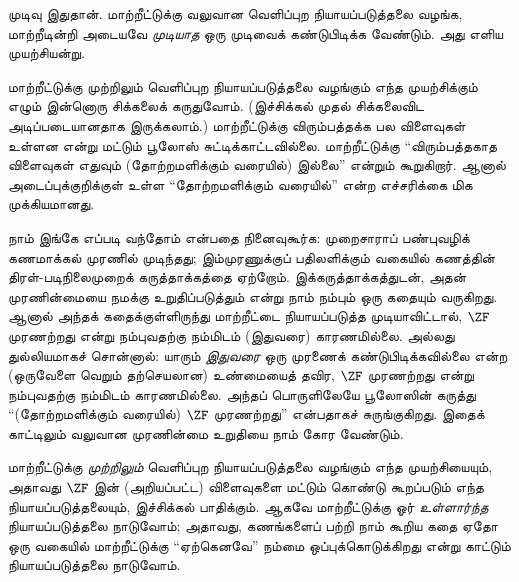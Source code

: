 \documentclass[../../../include/open-logic-section]{subfiles}
\begin{document}
முடிவு இதுதான். மாற்றீட்டுக்கு வலுவான வெளிப்புற நியாயப்படுத்தலை வழங்க,
மாற்றீடின்றி அடையவே \emph{முடியாத} ஒரு முடிவைக் கண்டுபிடிக்க வேண்டும்.
அது எளிய முயற்சியன்று.

மாற்றீட்டுக்கு முற்றிலும் வெளிப்புற நியாயப்படுத்தலை வழங்கும் எந்த
முயற்சிக்கும் எழும் இன்னொரு சிக்கலைக் கருதுவோம். (இச்சிக்கல் முதல்
சிக்கலைவிட அடிப்படையானதாக இருக்கலாம்.) மாற்றீட்டுக்கு விரும்பத்தக்க பல
விளைவுகள் உள்ளன என்று மட்டும் பூலோஸ் சுட்டிக்காட்டவில்லை. மாற்றீட்டுக்கு
``விரும்பத்தகாத விளைவுகள் எதுவும் (தோற்றமளிக்கும் வரையில்) இல்லை'' என்றும்
கூறுகிறார். ஆனால் அடைப்புக்குறிக்குள் உள்ள ``தோற்றமளிக்கும் வரையில்'' என்ற
எச்சரிக்கை மிக முக்கியமானது.

நாம் இங்கே எப்படி வந்தோம் என்பதை நினைவுகூர்க: முறைசாராப் பண்புவழிக்
கணமாக்கல் முரணில் முடிந்தது; இம்முரணுக்குப் பதிலளிக்கும் வகையில் கணத்தின்
திரள்-படிநிலைமுறைக் கருத்தாக்கத்தை ஏற்றோம். இக்கருத்தாக்கத்துடன், அதன்
முரணின்மையை நமக்கு உறுதிப்படுத்தும் என்று நாம் நம்பும் ஒரு கதையும் வருகிறது.
ஆனால் அந்தக் கதைக்குள்ளிருந்து மாற்றீட்டை நியாயப்படுத்த முடியாவிட்டால்,
$\ZF$ முரணற்றது என்று நம்புவதற்கு நம்மிடம் (இதுவரை) காரணமில்லை. அல்லது
துல்லியமாகச் சொன்னால்: யாரும் \emph{இதுவரை} ஒரு முரணைக் கண்டுபிடிக்கவில்லை
என்ற (ஒருவேளை வெறும் தற்செயலான) உண்மையைத் தவிர, $\ZF$ முரணற்றது என்று
நம்புவதற்கு நம்மிடம் காரணமில்லை. அந்தப் பொருளிலேயே பூலோஸின் கருத்து
``(தோற்றமளிக்கும் வரையில்) $\ZF$ முரணற்றது'' என்பதாகச் சுருங்குகிறது.
இதைக் காட்டிலும் வலுவான முரணின்மை உறுதியை நாம் கோர வேண்டும்.

மாற்றீட்டுக்கு \emph{முற்றிலும்} வெளிப்புற நியாயப்படுத்தலை வழங்கும் எந்த
முயற்சியையும், அதாவது $\ZF$ இன் (அறியப்பட்ட) விளைவுகளை மட்டும் கொண்டு
கூறப்படும் எந்த நியாயப்படுத்தலையும், இச்சிக்கல் பாதிக்கும். ஆகவே
மாற்றீட்டுக்கு ஓர் \emph{உள்ளார்ந்த} நியாயப்படுத்தலை நாடுவோம்; அதாவது,
கணங்களைப் பற்றி நாம் கூறிய கதை ஏதோ ஒரு வகையில் மாற்றீட்டுக்கு
``ஏற்கெனவே'' நம்மை ஒப்புக்கொடுக்கிறது என்று காட்டும் நியாயப்படுத்தலை நாடுவோம்.
\end{document}
